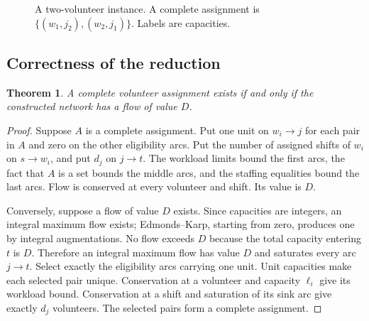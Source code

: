 \documentclass[sigconf,nonacm]{acmart}
\newtheorem{theorem}{Theorem}
\begin{document}
\begin{figure}[t]
\centering
{}
\caption{A two-volunteer instance. A complete assignment is
$\{(w_1,j_2),(w_2,j_1)\}$. Labels are capacities.}
\label{fig:network}
\end{figure}

\subsection{Correctness of the reduction}
\begin{theorem}
A complete volunteer assignment exists if and only if the constructed network
has a flow of value $D$.
\end{theorem}
\begin{proof}
Suppose $A$ is a complete assignment. Put one unit on $w_i\to j$ for each
pair in $A$ and zero on the other eligibility arcs. Put the number of assigned
shifts of $w_i$ on $s\to w_i$, and put $d_j$ on $j\to t$.
The workload limits bound the first arcs, the fact that $A$ is a set bounds
the middle arcs, and the staffing equalities bound the last arcs. Flow is
conserved at every volunteer and shift. Its value is $D$.

Conversely, suppose a flow of value $D$ exists. Since capacities are integers,
an integral maximum flow exists; Edmonds--Karp, starting from zero, produces
one by integral augmentations. No flow exceeds $D$ because the total capacity
entering $t$ is $D$. Therefore an integral maximum flow has value $D$ and
saturates every arc $j\to t$. Select exactly the eligibility arcs carrying
one unit. Unit capacities make each selected pair unique. Conservation at a
volunteer and capacity $\ell_i$ give its workload bound. Conservation at a
shift and saturation of its sink arc give exactly $d_j$ volunteers. The
selected pairs form a complete assignment.
\end{proof}
\end{document}

